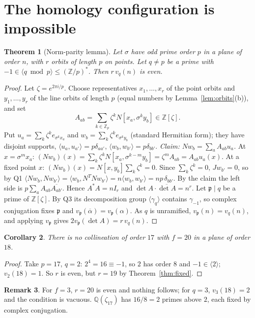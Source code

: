 \documentclass[11pt,a4paper]{article}
\newtheorem{theorem}{Theorem}[section]
\newtheorem{corollary}[theorem]{Corollary}
\theoremstyle{definition}
\newtheorem{remark}[theorem]{Remark}
\newcommand{\ZZ}{\mathbb{Z}}
\newcommand{\QQ}{\mathbb{Q}}
\begin{document}
\section{The homology configuration is impossible}\label{sec:homology}

\begin{theorem}[Norm-parity lemma]\label{thm:norm}
Let $\sigma$ have odd prime order $p$ in a plane of order $n$, with $r$ orbits of length $p$ on points. Let $q\ne p$ be a prime with $-1\in\langle q\bmod p\rangle\le(\ZZ/p)^{*}$. Then $r\,v_q(n)$ is even.
\end{theorem}
\begin{proof}
Let $\zeta=e^{2\pi i/p}$. Choose representatives $x_1,\dots,x_r$ of the point orbits and $y_1,\dots,y_r$ of the line orbits of length $p$ (equal numbers by Lemma~\ref{lem:orbits}(b)), and set
\[A_{ab}=\sum_{k\in\ZZ_p}\zeta^{k}N[x_a,\sigma^{k}y_b]\in\ZZ[\zeta].\]
Put $u_a=\sum_k\zeta^{k}e_{\sigma^kx_a}$ and $w_b=\sum_k\zeta^{k}e_{\sigma^ky_b}$ (standard Hermitian form); they have disjoint supports, $\langle u_a,u_{a'}\rangle=p\delta_{aa'}$, $\langle w_b,w_{b'}\rangle=p\delta_{bb'}$.
\emph{Claim: $Nw_b=\sum_aA_{ab}u_a$.} At $x=\sigma^mx_a$: $(Nw_b)(x)=\sum_k\zeta^kN[x_a,\sigma^{k-m}y_b]=\zeta^mA_{ab}=A_{ab}u_a(x)$. At a fixed point $x$: $(Nw_b)(x)=N[x,y_b]\sum_k\zeta^k=0$.
Since $\sum_k\zeta^k=0$, $Jw_{b'}=0$, so by Q1
$\langle Nw_b,Nw_{b'}\rangle=\langle w_b,N^TNw_{b'}\rangle=n\langle w_b,w_{b'}\rangle=np\,\delta_{bb'}$.
By the claim the left side is $p\sum_aA_{ab}\overline{A_{ab'}}$. Hence $A^*A=nI_r$ and $\det A\cdot\overline{\det A}=n^r$.
Let $\mathfrak p\mid q$ be a prime of $\ZZ[\zeta]$. By Q3 its decomposition group $\langle\gamma_q\rangle$ contains $\gamma_{-1}$, so complex conjugation fixes $\mathfrak p$ and $v_{\mathfrak p}(\overline\alpha)=v_{\mathfrak p}(\alpha)$. As $q$ is unramified, $v_{\mathfrak p}(n)=v_q(n)$, and applying $v_{\mathfrak p}$ gives $2v_{\mathfrak p}(\det A)=r\,v_q(n)$.
\end{proof}

\begin{corollary}\label{cor:homology}
There is no collineation of order $17$ with $f=20$ in a plane of order $18$.
\end{corollary}
\begin{proof}
Take $p=17$, $q=2$: $2^4=16\equiv-1$, so $2$ has order $8$ and $-1\in\langle2\rangle$; $v_2(18)=1$. So $r$ is even, but $r=19$ by Theorem~\ref{thm:fixed}.
\end{proof}
\begin{remark}
For $f=3$, $r=20$ is even and nothing follows; for $q=3$, $v_3(18)=2$ and the condition is vacuous. $\QQ(\zeta_{17})$ has $16/8=2$ primes above $2$, each fixed by complex conjugation.
\end{remark}
\end{document}
